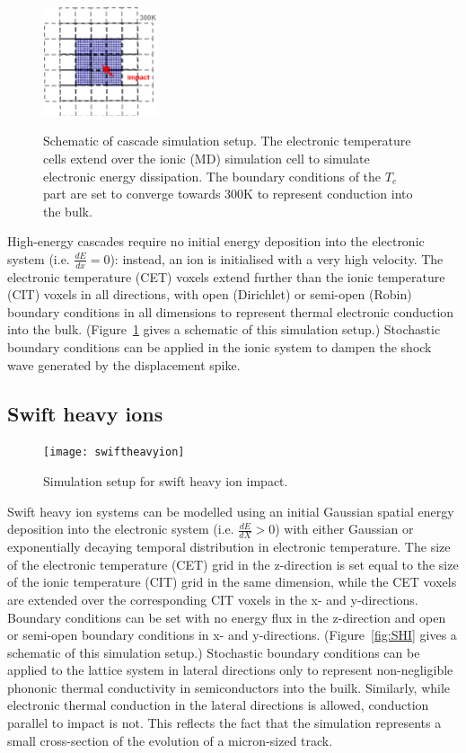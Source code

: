 \begin{figure}[h] 
	\centering
	{
		\includegraphics[width=0.3\textwidth]{cascades}
	}
	\caption{Schematic of cascade simulation setup. The electronic temperature cells extend over the ionic (MD) simulation cell to simulate electronic energy dissipation. The boundary conditions of the $T_e$ part are set to converge towards 300K to represent conduction into the bulk.}
	\label{fig:cascades}
\end{figure}
High-energy cascades require no initial energy deposition into the 
electronic system (i.e. $\frac{dE}{dx} = 0$): instead, an ion is 
initialised with a very high velocity. The electronic temperature 
(CET) voxels extend further than the ionic temperature (CIT) 
voxels in all directions, with open (Dirichlet) or semi-open 
(Robin) boundary conditions in all dimensions to represent thermal 
electronic conduction into the bulk. (Figure~\ref{fig:cascades} gives 
a schematic of this simulation setup.) Stochastic boundary 
conditions can be applied in the ionic system to dampen the shock 
wave generated by the displacement spike.

\subsection*{Swift heavy ions}

\begin{figure}[h] 
	\centering
	{
		\texttt{[image: swiftheavyion]}
	}
	\caption{Simulation setup for swift heavy ion impact.}
	\label{fig: SHI}
\end{figure}
Swift heavy ion systems can be modelled using an initial Gaussian 
spatial energy deposition into the electronic system (i.e. 
$\frac{dE}{dX} > 0$) with either Gaussian or exponentially decaying 
temporal distribution in electronic temperature. The size of the 
electronic temperature (CET) grid in the z-direction is set equal to 
the size of the ionic temperature (CIT) grid in the same dimension, 
while the CET voxels are extended over the corresponding CIT 
voxels in the x- and y-directions. Boundary conditions can be set 
with no energy flux in the z-direction and open or semi-open 
boundary conditions in x- and y-directions. (Figure~\ref{fig:SHI} 
gives a schematic of this simulation setup.) Stochastic boundary 
conditions can be applied to the lattice system in lateral directions 
only to represent non-negligible phononic thermal conductivity 
in semiconductors into the builk. Similarly, while electronic thermal 
conduction in the lateral directions is allowed, conduction parallel to 
impact is not. This reflects the fact that the simulation represents a 
small cross-section of the evolution of a micron-sized track.

